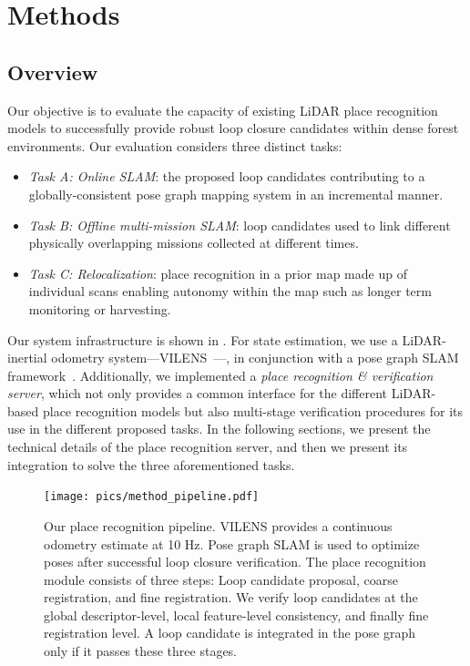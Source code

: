 \chapter{Methods}
\label{ch:methods}

\section{Overview}
\label{sec:overview}
Our objective is to evaluate the capacity of existing LiDAR place recognition models to successfully provide robust loop closure candidates within dense forest environments. Our evaluation considers three distinct tasks: 
\begin{itemize}
  \listparindent=-20pt
  \item \emph{Task A: Online SLAM}: the proposed loop candidates contributing to a globally-consistent pose graph mapping system in an incremental manner.
  \item \emph{Task B: Offline multi-mission SLAM}: loop candidates used to link different physically overlapping missions collected at different times.
  \item \emph{Task C: Relocalization}: place recognition in a prior map made up of individual scans enabling autonomy within the map such as longer term monitoring or harvesting.
\end{itemize}

Our system infrastructure is shown in . For state estimation, we use a LiDAR-inertial odometry system---VILENS~\cite{wisth2023tro}---, in conjunction with a pose graph SLAM framework~\cite{proudman2022ras}. Additionally, we implemented a \emph{place recognition \& verification server}, which not only provides a common interface for the different LiDAR-based place recognition models but also multi-stage verification procedures for its use in the different proposed tasks.
In the following sections, we present the technical details of the place recognition server, and then we present its integration to solve the three aforementioned tasks. 


\begin{figure}[t]
  \centering
  \texttt{[image: pics/method\_pipeline.pdf]}
  \caption{Our place recognition pipeline. VILENS provides a continuous odometry estimate at 10 Hz. Pose graph SLAM is used to optimize poses after successful loop closure verification. 
  The place recognition module consists of three steps: Loop candidate proposal, coarse registration, and fine registration. We verify loop candidates
  at the global descriptor-level, local feature-level consistency, and finally fine registration level. A loop candidate is integrated in the pose graph only if it passes these three stages.}
  \label{fig:pipeline}
\end{figure}

